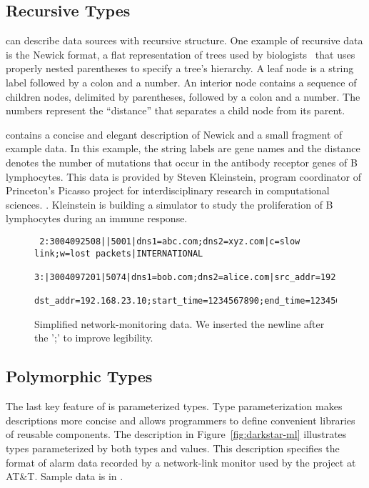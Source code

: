 \subsection{Recursive Types}

\padsml{} can describe data sources with recursive structure.  One
example of recursive data is the Newick format, a flat representation
of trees used by biologists~\cite{newick} that uses properly nested
parentheses to specify a tree's hierarchy.  A leaf node is a string
label followed by a colon and a number.  An interior node contains a
sequence of children nodes, delimited by parentheses, followed by a
colon and a number.  The numbers represent the ``distance'' that
separates a child node from its parent.

 contains a concise and elegant description of Newick
and a small fragment of example data.  In this example, the string
labels are gene names and the distance denotes the number of mutations
that occur in the antibody receptor genes of B lymphocytes.  This
data is provided by Steven Kleinstein, program coordinator of
Princeton's Picasso project for interdisciplinary research in
computational sciences.  . Kleinstein is building a simulator to study
the proliferation of B lymphocytes during an immune response.

\begin{figure}
  \centering
  \small
\begin{verbatim}
 2:3004092508||5001|dns1=abc.com;dns2=xyz.com|c=slow link;w=lost packets|INTERNATIONAL
 3:|3004097201|5074|dns1=bob.com;dns2=alice.com|src_addr=192.168.0.10;
 dst_addr=192.168.23.10;start_time=1234567890;end_time=1234568000;cycle_time=17412|SPECIAL
\end{verbatim}  
  \caption{Simplified network-monitoring data. We inserted the newline
    after the ';' to improve legibility.}
  \label{fig:darkstar-records1}
\end{figure}

\subsection{Polymorphic Types}

The last key feature of \padsml{} is parameterized types.  Type
parameterization makes descriptions more concise and allows
programmers to define convenient libraries of reusable components. The
description in Figure~\ref{fig:darkstar-ml} illustrates types
parameterized by both types and values.  This description specifies
the format of alarm data recorded by a network-link monitor used by
the \darkstar{} project at AT\&T.  Sample \darkstar{} data is in
.

